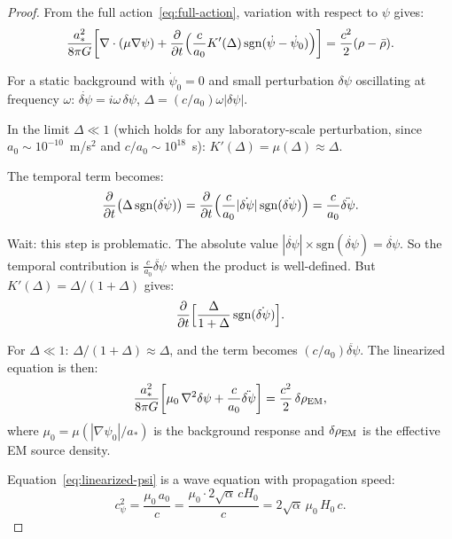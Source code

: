 \documentclass[11pt]{article}
\begin{document}
\begin{proof}
From the full action~\eqref{eq:full-action}, variation with respect to
$\psi$ gives:
\begin{equation}
\frac{a_*^2}{8\pi G}\biggl[
  \nabla \cdot (\mu \nabla\psi)
  + \frac{\partial}{\partial t}\Bigl(\frac{c}{a_0}K'(\Delta)\,
    \mathrm{sgn}(\dot\psi - \dot\psi_0)\Bigr)
\biggr]
= \frac{c^2}{2}(\rho - \bar\rho).
\end{equation}

For a static background with $\dot\psi_0 = 0$ and small perturbation
$\delta\psi$ oscillating at frequency $\omega$:
$\dot{\delta\psi} = i\omega\,\delta\psi$,
$\Delta = (c/a_0)\omega|\delta\psi|$.

In the limit $\Delta \ll 1$ (which holds for any laboratory-scale
perturbation, since $a_0 \sim 10^{-10}$~m/s$^2$ and $c/a_0 \sim 10^{18}$~s):
$K'(\Delta) = \mu(\Delta) \approx \Delta$.

The temporal term becomes:
\begin{equation}
\frac{\partial}{\partial t}\bigl(\Delta\,\mathrm{sgn}(\dot{\delta\psi})\bigr)
= \frac{\partial}{\partial t}\Bigl(\frac{c}{a_0}|\dot{\delta\psi}|\,
  \mathrm{sgn}(\dot{\delta\psi})\Bigr)
= \frac{c}{a_0}\ddot{\delta\psi}.
\end{equation}

Wait: this step is problematic. The absolute value $|\dot{\delta\psi}|
\times \mathrm{sgn}(\dot{\delta\psi}) = \dot{\delta\psi}$. So the
temporal contribution is $\frac{c}{a_0}\ddot{\delta\psi}$ when the
product is well-defined. But $K'(\Delta) = \Delta/(1+\Delta)$ gives:
\begin{equation}
\frac{\partial}{\partial t}\Bigl[\frac{\Delta}{1+\Delta}\,
  \mathrm{sgn}(\dot{\delta\psi})\Bigr].
\end{equation}

For $\Delta \ll 1$: $\Delta/(1+\Delta) \approx \Delta$, and the term
becomes $(c/a_0)\ddot{\delta\psi}$. The linearized equation is then:
\begin{equation}
\frac{a_*^2}{8\pi G}\biggl[
  \mu_0\,\nabla^2\delta\psi
  + \frac{c}{a_0}\ddot{\delta\psi}
\biggr]
= \frac{c^2}{2}\,\delta\rho_{\rm EM},
\label{eq:linearized-psi}
\end{equation}
where $\mu_0 = \mu(|\nabla\psi_0|/a_*)$ is the background response and
$\delta\rho_{\rm EM}$ is the effective EM source density.

Equation~\eqref{eq:linearized-psi} is a wave equation with
propagation speed:
\begin{equation}
c_\psi^2 = \frac{\mu_0\,a_0}{c} = \frac{\mu_0 \cdot 2\sqrt{\alpha}\,cH_0}{c}
= 2\sqrt{\alpha}\,\mu_0\,H_0\,c.
\end{equation}


\end{proof}
\end{document}

